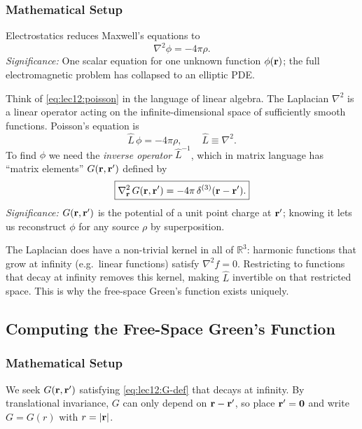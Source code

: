 \subsubsection*{Mathematical Setup}
Electrostatics reduces Maxwell's equations to
\begin{equation}\label{eq:lec12:poisson}
  \boxed{
    \nabla^2 \phi = -4\pi\rho .
  }
\end{equation}
\textit{Significance:} One scalar equation for one unknown function $\phi(\mathbf{r})$;
the full electromagnetic problem has collapsed to an elliptic PDE.

Think of \eqref{eq:lec12:poisson} in the language of linear algebra.  The Laplacian
$\nabla^2$ is a linear operator acting on the infinite-dimensional space of sufficiently
smooth functions.  Poisson's equation is
\begin{equation}\label{eq:lec12:operator-form}
  \hat{L}\,\phi = -4\pi\rho,
  \qquad
  \hat{L} \equiv \nabla^2 .
\end{equation}
To find $\phi$ we need the \emph{inverse operator} $\hat{L}^{-1}$, which in matrix language
has ``matrix elements'' $G(\mathbf{r},\mathbf{r}')$ defined by
\begin{equation}\label{eq:lec12:G-def}
  \boxed{
    \nabla^2_{\mathbf{r}}\, G(\mathbf{r},\mathbf{r}') = -4\pi\,\delta^{(3)}(\mathbf{r} - \mathbf{r}') .
  }
\end{equation}
\textit{Significance:} $G(\mathbf{r},\mathbf{r}')$ is the potential of a unit point charge at $\mathbf{r}'$; knowing it
lets us reconstruct $\phi$ for any source $\rho$ by superposition.

\begin{remark}
  The Laplacian does have a non-trivial kernel in all of $\mathbb{R}^3$: harmonic functions
  that grow at infinity (e.g.\ linear functions) satisfy $\nabla^2 f = 0$.  Restricting to
  functions that decay at infinity removes this kernel, making $\hat{L}$ invertible on that
  restricted space.  This is why the free-space Green's function exists uniquely.
\end{remark}

\subsection{Computing the Free-Space Green's Function}\label{subsec:lec12-greens-function}

\subsubsection*{Mathematical Setup}
We seek $G(\mathbf{r},\mathbf{r}')$ satisfying \eqref{eq:lec12:G-def} that decays at infinity.
By translational invariance, $G$ can only depend on $\mathbf{r} - \mathbf{r}'$, so place $\mathbf{r}' = \mathbf{0}$
and write $G = G(r)$ with $r = |\mathbf{r}|$.

